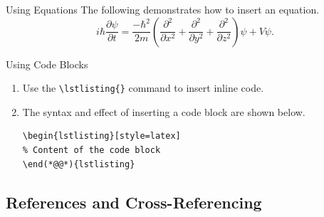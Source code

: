 \documentclass[8pt]{beamer}
\begin{document}
\begin{frame}[fragile]{\insertsection}{\insertsubsection}
    \label{frame:eq_and_code}

    \begin{block}{Using Equations}
        The following demonstrates how to insert an equation.
        \begin{equation}
            \label{eq:example}
            i\hbar\frac{\partial \psi}{\partial t}
= \frac{-\hbar^2}{2m} \left(
\frac{\partial^2}{\partial x^2}
+ \frac{\partial^2}{\partial y^2}
+ \frac{\partial^2}{\partial z^2}
\right) \psi + V \psi.
        \end{equation}
    \end{block}

    \begin{block}{Using Code Blocks}
        \begin{enumerate}
            \item Use the \lstinline|\lstlisting{}| command to insert inline code.
            \item The syntax and effect of inserting a code block are shown below.
            \begin{lstlisting}[style=latex]
\begin{lstlisting}[style=latex]
% Content of the code block
\end(*@@*){lstlisting}
            \end{lstlisting}
        \end{enumerate}
    \end{block}
\end{frame}


\subsection{References and Cross-Referencing}
\end{document}
